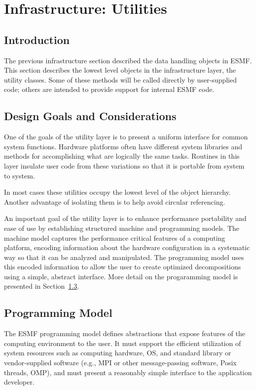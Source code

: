 \section{Infrastructure: Utilities}
\label{sec:utilclasses}

\subsection{Introduction}

The previous infrastructure section described the data handling 
objects in ESMF. This section describes the lowest level
objects in the infrastructure layer, the utility classes.
Some of these methods will be called directly by user-supplied
code; others are intended to provide support for internal ESMF 
code.

\subsection{Design Goals and Considerations}

One of the goals of the utility layer is to present a uniform interface
for common system functions.  Hardware platforms often have
different system libraries and methods for accomplishing what are 
logically the same tasks.  Routines in this layer insulate user code 
from these variations so that it is portable from system to system.  

In most cases these utilities occupy the lowest level of the object hierarchy.
Another advantage of isolating them is to help avoid circular referencing.

An important goal of the utility layer is to enhance performance portability and
ease of use by establishing structured machine and programming models.  
The machine model captures the performance critical features of a computing 
platform, encoding information about the hardware configuration in a 
systematic way so that it can be analyzed and manipulated.  The programming
model uses this encoded information to allow the user to create
optimized decompositions using a simple, abstract interface.  More detail
on the progaramming model is presented in Section~\ref{sec:progmodel}.

\subsection{Programming Model}
\label{sec:progmodel}

The ESMF programming model defines abstractions that expose
features of the computing environment to the user.  It must support the 
efficient utilization of system resources such as   
computing hardware, OS, and standard library or vendor-supplied 
software (e.g., MPI or other message-passing software, Posix threads, OMP),
and must present a reasonably simple interface to the application 
developer.  

